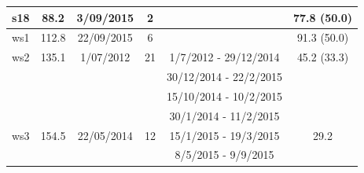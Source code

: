 \begin{table}
\begin{tabular}{|c|c|c|c|c|c|}
\hline
s18                                                 & 88.2                                                    & 3/09/2015                                                 & 2                                                       &                         & 77.8 (50.0)                                                             \\ 
\hline
ws1                                                 & 112.8                                                   & 22/09/2015                                                & 6                                                       &                         & 91.3 (50.0)                                                             \\ 
\hline
ws2                                                 & 135.1                                                   & 1/07/2012                                                 & 21                                                      & 1/7/2012 - 29/12/2014   & 45.2 (33.3)                                                             \\ 
\cline{5-5}
                                                    &                                                         &                                                           &                                                         & 30/12/2014 - 22/2/2015  &                                                                         \\ 
\cline{5-5}
                                                    &                                                         &                                                           &                                                         & 15/10/2014 - 10/2/2015  &                                                                         \\ 
\cline{5-5}
                                                    &                                                         &                                                           &                                                         & 30/1/2014 - 11/2/2015   &                                                                         \\ 
\hline
ws3                                                 & 154.5                                                   & 22/05/2014                                                & 12                                                      & 15/1/2015 - 19/3/2015   & 29.2                                                                    \\ 
\cline{5-5}
                                                    &                                                         &                                                           &                                                         & 8/5/2015 - 9/9/2015     &                                                                         \\
\hline
\end{tabular}
\end{table}

